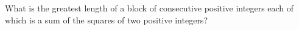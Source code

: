 What is the greatest length of a block of consecutive positive integers each of which is a sum of the squares of two positive integers?
